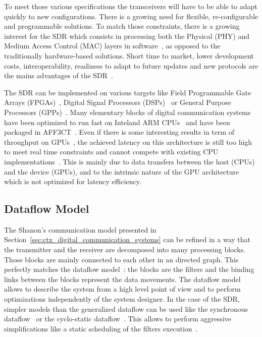 To meet those various specifications the transceivers will have to be able to
adapt quickly to new configurations. There is a growing need for flexible,
re-configurable and programmable solutions. To match those constraints, there is
a growing interest for the SDR which consists in processing both the Physical
(PHY) and Medium Access Control (MAC) layers in software~\cite{Mitola1993}, as
opposed to the traditionally hardware-based solutions. Short time to market,
lower development costs, interoperability, readiness to adapt to future updates
and new protocols are the mains advantages of the SDR~\cite{Akeela2018}.

The SDR can be implemented on various targets like Field Programmable Gate
Arrays (FPGAs)~\cite{Coulton2004,Skey2006,Dutta2010,Shaik2013,Maheshwarappa2015,
Nivin2016}, Digital Signal Processors (DSPs)~\cite{Kaur2008,Karlsson2013,
Shaik2013} or General Purpose Processors (GPPs)~\cite{Yoge2012,Bang2014,
Meshram2019,Grayver2020}. Many elementary blocks of digital communication
systems have been optimized to run fast on Intel\R and ARM\R
CPUs~\cite{Cassagne2015c,Cassagne2016a,Cassagne2016b,Cassagne2018,Leonardon2019,
Ghaffari2019} and have been packaged in AFF3CT~\cite{Cassagne2017a,
Cassagne2019a}. Even if there is some interesting results in term of throughput
on GPUs~\cite{Xianjun2013,Li2014,LeGal2014a,Giard2016b,Keskin2017a}, the
achieved latency on this architecture is still too high to meet real time
constraints and cannot compete with existing CPU
implementations~\cite{LeGal2015a,Cassagne2015c,Giard2016b,Cassagne2016a,
LeGal2017,Leonardon2019,LeGal2019a}. This is mainly due to data transfers
between the host (CPUs) and the device (GPUs), and to the intrinsic nature of
the GPU architecture which is not optimized for latency efficiency.

\subsection{Dataflow Model}

The Shanon's communication model presented in
Section~\ref{sec:ctx_digital_communication_systems} can be refined in a way
that the transmitter and the receiver are decomposed into many processing
blocks. Those blocks are mainly connected to each other in an directed graph.
This perfectly matches the dataflow model~\cite{Dennis1980,Ackerman1982}: the
blocks are the filters and the binding links between the blocks represent the
data movements. The dataflow model allows to describe the system from a high
level point of view and to perform optimizations independently of the system
designer. In the case of the SDR, simpler models than the generalized dataflow
can be used like the synchronous dataflow~\cite{Lee1987} or the cyclo-static
dataflow~\cite{Engels1994,Bilsen1995}. This allows to perform aggressive
simplifications like a static scheduling of the filters
execution~\cite{Parks1995}.

